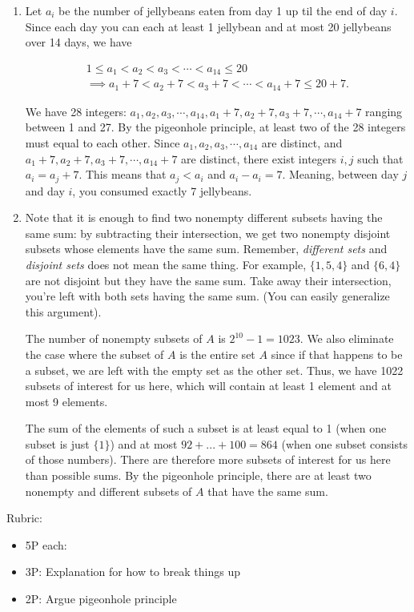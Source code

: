 \documentclass{article}
\theoremstyle{definition}
\begin{document}
\begin{solution}
\begin{enumerate}
	\item Let \(a_i\) be the number of jellybeans eaten from day 1 up til the end of day \(i\). Since each day you can each at least 1 jellybean and at most 20 jellybeans over 14 days,  we have
	
	\begin{gather*}
	    1\leq a_1 < a_2 < a_3 < \cdots < a_{14} \leq 20
     \\
        \implies a_1+7 < a_2 +7< a_3 +7< \cdots < a_{14}+7 \leq 20+7.
	\end{gather*}

We have 28 integers: \(a_1 , a_2 , a_3 , \cdots , a_{14}, a_1+7 , a_2 +7, a_3 +7, \cdots , a_{14}+7\) ranging between 1 and 27. By the pigeonhole principle, at least two of the 28 integers must equal to each other. Since  \(a_1 , a_2 , a_3 , \cdots , a_14\) are distinct, and \(a_1+7 , a_2 +7, a_3 +7, \cdots , a_{14}+7\) are distinct, there exist integers \(i, j\) such that \(a_i = a_j+7\). This means that \(a_j<a_i\) and \(a_i-a_i = 7\). Meaning, between day \(j\) and day \(i\), you consumed exactly 7 jellybeans.

	\item Note that it is enough to find two nonempty different subsets having the same sum: by subtracting their intersection, we get two nonempty disjoint subsets whose elements have the same sum. Remember, \textit{different sets} and \textit{disjoint sets } does not mean the same thing. For example, \(\{1,5,4\}\) and \(\{6,4\}\) are not disjoint but they have the same sum. Take away their intersection, you're left with both sets having the same sum. (You can easily generalize this argument). 
	
	
	The number of nonempty subsets of \(A\) is \(2^{10}-1 = 1023\). We also eliminate the case where the subset of \(A\) is the entire set \(A\) since if that happens to be a subset, we are left with the empty set as the other set. Thus, we have 1022 subsets of interest for us here, which will contain at least 1 element and at most 9 elements.
	
	 The sum of the elements of such a subset is at least equal to 1 (when one subset is just \(\{1\}\)) and at most \( 92 + ... + 100 = 864\) (when one subset consists of those numbers). There are therefore more subsets of interest for us here than possible sums. By the pigeonhole principle, there are at least two nonempty and different subsets of \(A\) that have the same sum.
	 
\end{enumerate}

{\color{red} Rubric:
\begin{itemize}
\item 5P each:
\item 3P: Explanation for how to break things up
\item 2P: Argue pigeonhole principle
\end{itemize}}
\end{solution}
\end{document}
